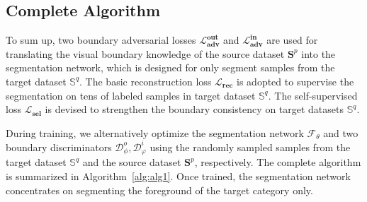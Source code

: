 \documentclass[letterpaper]{article} %
\begin{document}
\subsection{Complete Algorithm}
To sum up, two boundary adversarial losses $\mathbf{\mathcal{L}^{out}_{adv}}$ and $\mathbf{\mathcal{L}^{in}_{adv}}$ are used for translating the visual boundary knowledge of the source dataset $\mathbf{S}^p$ into the segmentation network, which is designed for only segment samples from the target dataset $\mathbb{S}^q$.
The basic reconstruction loss $\mathbf{\mathcal{L}_{rec}}$ is adopted to supervise the segmentation on tens of labeled samples in target dataset $\mathbb{S}^q$. The self-supervised loss $\mathbf{\mathcal{L}_{sel}}$ is devised to strengthen the boundary consistency on target datasets $\mathbb{S}^q$.

During training, we alternatively optimize the segmentation network $\mathcal{F}_{\theta}$ and two boundary discriminators $ \mathcal{D}^o_{\phi},\mathcal{D}^i_{\varphi}$ using the randomly sampled samples from the  target dataset $\mathbb{S}^q$ and the source dataset $\mathbf{S}^p$, respectively. The complete algorithm is summarized in Algorithm~\ref{alg:alg1}. Once trained, the segmentation network concentrates on segmenting the foreground of the target category only.
\end{document}
